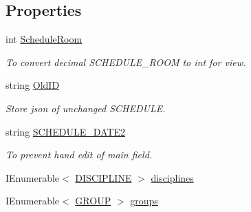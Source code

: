 \subsection*{Properties}
\begin{DoxyCompactItemize}
\item 
int \hyperlink{class_in_study_asp_1_1_models_1_1_user_1_1_teacher_1_1_view_model_schedule_a8de805afbeab5943816641787f787071}{Schedule\+Room}
\begin{DoxyCompactList}\small\item\em To convert decimal S\+C\+H\+E\+D\+U\+L\+E\+\_\+\+R\+O\+OM to int for view. \end{DoxyCompactList}\item 
string \hyperlink{class_in_study_asp_1_1_models_1_1_user_1_1_teacher_1_1_view_model_schedule_a8263bc709f1e63fd8d4406f1ad2d9f6f}{Old\+ID}
\begin{DoxyCompactList}\small\item\em Store json of unchanged S\+C\+H\+E\+D\+U\+LE. \end{DoxyCompactList}\item 
string \hyperlink{class_in_study_asp_1_1_models_1_1_user_1_1_teacher_1_1_view_model_schedule_a36455e485d079b033236de1c892adb8f}{S\+C\+H\+E\+D\+U\+L\+E\+\_\+\+D\+A\+T\+E2}
\begin{DoxyCompactList}\small\item\em To prevent hand edit of main field. \end{DoxyCompactList}\item 
I\+Enumerable$<$ \hyperlink{class_e_f_oracle_1_1_model_1_1_d_i_s_c_i_p_l_i_n_e}{D\+I\+S\+C\+I\+P\+L\+I\+NE} $>$ \hyperlink{class_in_study_asp_1_1_models_1_1_user_1_1_teacher_1_1_view_model_schedule_ab78fd27cfd27e6f1be6c414acff93b41}{disciplines}
\item 
I\+Enumerable$<$ \hyperlink{class_e_f_oracle_1_1_model_1_1_g_r_o_u_p}{G\+R\+O\+UP} $>$ \hyperlink{class_in_study_asp_1_1_models_1_1_user_1_1_teacher_1_1_view_model_schedule_a51d1addd43459362469f427a00436f50}{groups}
\end{DoxyCompactItemize}
